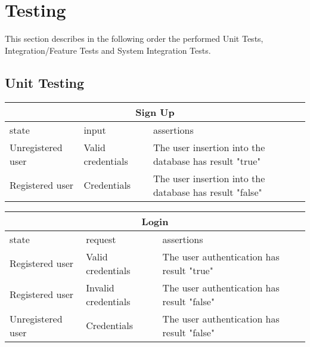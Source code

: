 \section{Testing}

This section describes in the following order the performed Unit Tests, Integration/Feature Tests and System Integration Tests.

\subsection{Unit Testing}

\begin{center}
	\begin{tabular}{|p{}|p{}|p{}|}
		\hline
		\multicolumn{3}{c}{Sign Up}\\
		\hline
		state & input & assertions\\
		\hline
		Unregistered user &
		Valid credentials& 
		The user insertion into the database has  result "true"\newline
		\\
		\hline
		Registered user &
		Credentials& 
		The user insertion into the database has result "false" \newline
		\\
		\hline
	\end{tabular}
\end{center}

\begin{center}
	\begin{tabular}{|p{}|p{}|p{}|}
		\hline
		\multicolumn{3}{c}{Login}\\
		\hline
		state & request & assertions\\
		\hline
		Registered user& 
		Valid credentials &
		The user authentication has result "true" \newline
		\\
		\hline
		Registered user & 
		Invalid credentials &
		The user authentication has result "false"  \newline
		\\
		\hline
		Unregistered user & 
		Credentials &
		The user authentication has result "false"  \newline
		\\
		\hline
	\end{tabular}
\end{center}

